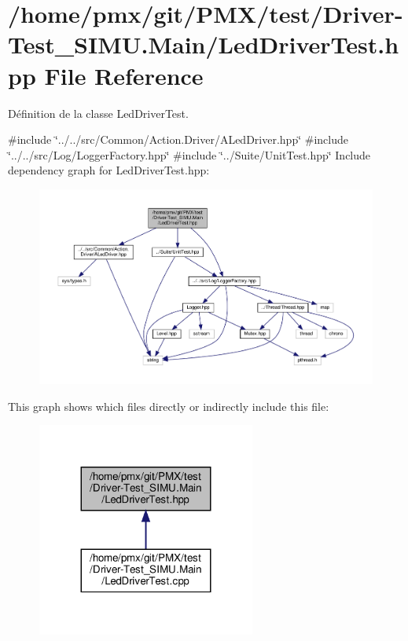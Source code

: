 \hypertarget{Driver-Test__SIMU_8Main_2LedDriverTest_8hpp}{}\section{/home/pmx/git/\+P\+M\+X/test/\+Driver-\/\+Test\+\_\+\+S\+I\+MU.Main/\+Led\+Driver\+Test.hpp File Reference}
\label{Driver-Test__SIMU_8Main_2LedDriverTest_8hpp}


Définition de la classe Led\+Driver\+Test.  


{\ttfamily \#include \char`\"{}../../src/\+Common/\+Action.\+Driver/\+A\+Led\+Driver.\+hpp\char`\"{}}\newline
{\ttfamily \#include \char`\"{}../../src/\+Log/\+Logger\+Factory.\+hpp\char`\"{}}\newline
{\ttfamily \#include \char`\"{}../\+Suite/\+Unit\+Test.\+hpp\char`\"{}}\newline
Include dependency graph for Led\+Driver\+Test.\+hpp\+:
\nopagebreak
\begin{figure}[H]
\begin{center}
\leavevmode
\includegraphics[width=350pt]{Driver-Test__SIMU_8Main_2LedDriverTest_8hpp__incl}
\end{center}
\end{figure}
This graph shows which files directly or indirectly include this file\+:
\nopagebreak
\begin{figure}[H]
\begin{center}
\leavevmode
\includegraphics[width=203pt]{Driver-Test__SIMU_8Main_2LedDriverTest_8hpp__dep__incl}
\end{center}
\end{figure}
